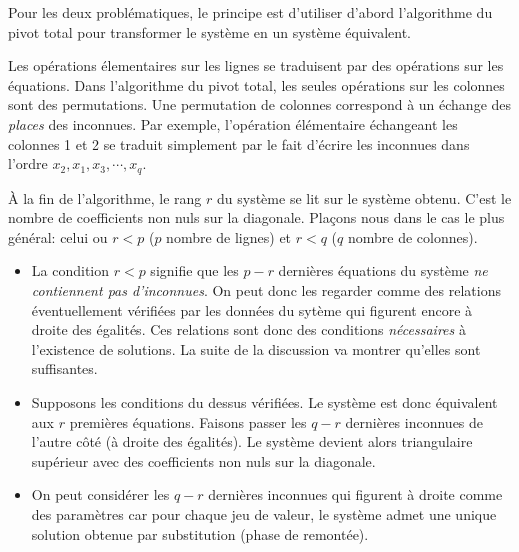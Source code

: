 Pour les deux problématiques, le principe est d'utiliser d'abord l'algorithme du pivot total pour transformer le système en un système équivalent.
\begin{rem}
Les opérations élementaires sur les lignes se traduisent par des opérations sur les équations.\newline
Dans l'algorithme du pivot total, les seules opérations sur les colonnes sont des permutations. Une permutation de colonnes correspond à un échange des \emph{places} des inconnues. Par exemple, l'opération élémentaire échangeant les colonnes 1 et 2 se traduit simplement par le fait d'écrire les inconnues dans l'ordre $x_2, x_1, x_3, \cdots, x_q$. 
\end{rem}
\`A la fin de l'algorithme, le rang $r$ du système se lit sur le système obtenu. C'est le nombre de coefficients non nuls sur la \og diagonale\fg.\newline
Plaçons nous dans le cas le plus général: celui ou $r < p$ ($p$ nombre de lignes) et $r < q$ ($q$ nombre de colonnes).
\vspace{0.2cm}
\begin{itemize}
 \item La condition $r < p$ signifie que les $p-r$ dernières équations du système \emph{ne contiennent pas d'inconnues}.\newline
 On peut donc les regarder comme des relations éventuellement vérifiées par les données du sytème qui figurent encore à droite des égalités. Ces relations sont donc des conditions \emph{nécessaires} à l'existence de solutions. La suite de la discussion va montrer qu'elles sont suffisantes.
 \item Supposons les conditions du dessus vérifiées. Le système est donc équivalent aux $r$ premières équations.\newline
 Faisons passer les $q-r$ dernières inconnues de l'autre côté (à droite des égalités). Le système devient alors triangulaire supérieur avec des coefficients non nuls sur la diagonale.
 \item On peut considérer les $q-r$ dernières inconnues qui figurent à droite comme des paramètres car pour chaque jeu de valeur, le système admet une unique solution obtenue par substitution (phase de remontée).
\end{itemize}




